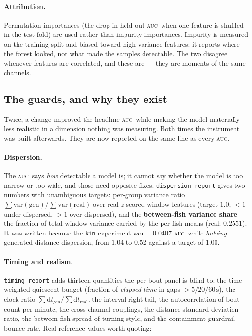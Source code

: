 \documentclass[11pt,a4paper]{article}
\newcommand{\uu}[1]{\ensuremath{\,\mathrm{#1}}}  %
\newcommand{\auc}{\textsc{auc}}
\newcommand{\code}[1]{\texttt{\small #1}}
\begin{document}
\paragraph{Attribution.} Permutation importances (the drop in held-out \auc\ when one
feature is shuffled in the test fold) are used rather than impurity importances. Impurity
is measured on the training split and biased toward high-variance features: it reports
where the forest looked, not what made the samples detectable. The two disagree whenever
features are correlated, and these are --- they are moments of the same channels.

\subsection{The guards, and why they exist}\label{sec:guards}

Twice, a change improved the headline \auc\ while making the model materially less
realistic in a dimension nothing was measuring. Both times the instrument was built
afterwards. They are now reported on the same line as every \auc.

\paragraph{Dispersion.}
The \auc\ says \emph{how} detectable a model is; it cannot say whether the model is too
narrow or too wide, and those need opposite fixes. \code{dispersion\_report} gives two
numbers with unambiguous targets: per-group variance ratio
$\sum\mathrm{var}(\mathrm{gen}) / \sum\mathrm{var}(\mathrm{real})$ over real-$z$-scored
window features (target $1.0$; $<1$ under-dispersed, $>1$ over-dispersed), and the
\textbf{between-fish variance share} --- the fraction of total window variance carried by
the per-fish means (real: $\mathbf{0.2551}$). It was written because the \code{kin}
experiment won $-0.0407$ \auc\ while \emph{halving} generated distance dispersion, from
$1.04$ to $0.52$ against a target of $1.00$.

\paragraph{Timing and realism.}
\code{timing\_report} adds thirteen quantities the per-bout panel is blind to: the
time-weighted quiescent budget (fraction of \emph{elapsed time} in gaps
$>5/20/60\uu{s}$), the clock ratio $\sum \mathrm{d}t_{\mathrm{gen}} /
\sum \mathrm{d}t_{\mathrm{real}}$, the interval right-tail, the autocorrelation of bout
count per minute, the cross-channel couplings, the distance standard-deviation ratio, the
between-fish spread of turning style, and the containment-guardrail bounce rate. Real
reference values worth quoting:
\end{document}
